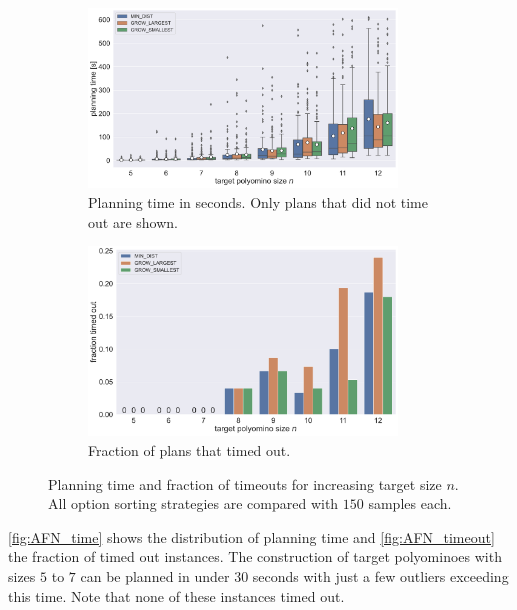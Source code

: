 \begin{figure}
	\centering
	\begin{subfigure}[b]{\textwidth}
		\centering
		\includegraphics[width=0.9\textwidth]{figures/plots/AFN_time.pdf}
		\caption{Planning time in seconds. Only plans that did not time out are shown.}
		\label{fig:AFN_time}
	\end{subfigure}

	\begin{subfigure}[b]{\textwidth}
		\centering
		\includegraphics[width=0.9\textwidth]{figures/plots/AFN_timeout.pdf}
		\caption{Fraction of plans that timed out.}
		\label{fig:AFN_timeout}
	\end{subfigure}
	\caption[Planning time and fraction of timeouts for increasing target size]{Planning time and fraction of timeouts for increasing target size $n$. All option sorting strategies are compared with $150$ samples each.}
	\label{fig:AFN_timestats}
\end{figure}

\autoref{fig:AFN_time} shows the distribution of planning time and \autoref{fig:AFN_timeout} the fraction of timed out instances.
The construction of target polyominoes with sizes $5$ to $7$ can be planned in under $30$ seconds with just a few outliers exceeding this time.
Note that none of these instances timed out.

